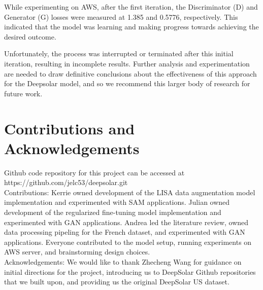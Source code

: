 \documentclass[10pt,twocolumn,letterpaper]{article}
\begin{document}
While experimenting on AWS, after the first iteration, the Discriminator (D) and Generator (G) losses were measured at 1.385 and 0.5776, respectively. This indicated that the model was learning and making progress towards achieving the desired outcome.

Unfortunately, the process was interrupted or terminated after this initial iteration, resulting in incomplete results.  Further analysis and experimentation are needed to draw definitive conclusions about the effectiveness of this approach for the Deepsolar model, and so we recommend this larger body of research for future work.



\newpage
\section{Contributions and Acknowledgements}
Github code repository for this project can be accessed at https://github.com/jelc53/deepsolar.git \\

Contributions: Kerrie owned development of the LISA data augmentation model implementation and experimented with SAM applications. Julian owned development of the regularized fine-tuning model implementation and experimented with GAN applications. Andrea led the literature review, owned data processing pipeling for the French dataset, and experimented with GAN applications. Everyone contributed to the model setup, running experiments on AWS server, and brainstorming design choices. \\

Acknowledgements: We would like to thank Zhecheng Wang for guidance on initial directions for the project, introducing us to DeepSolar Github repositories that we built upon, and providing us the original DeepSolar US dataset.



\newpage
{\small


}
\end{document}
